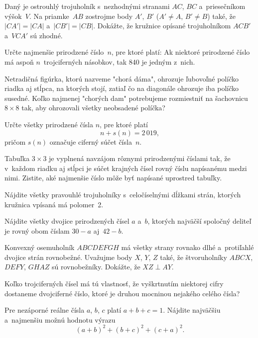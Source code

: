 {%
Daný je ostrouhlý trojuholník s~nezhodnými stranami $AC$, $BC$
a~priesečníkom výšok~$V$. Na priamke~$AB$ zostrojme body $A'$, $B'$
($A'\ne A$, $B'\ne B$) také, že $|CA'|=|CA|$ a~$|CB'|=|CB|$. Dokážte,
že kružnice opísané trojuholníkom $ACB'$ a~$VCA'$ sú zhodné.}

{%
Určte najmenšie prirodzené číslo~$n$, pre ktoré platí: Ak niektoré
prirodzené číslo má aspoň $n$~trojciferných násobkov, tak 840 je jedným
z~nich.}

{%
Netradičná figúrka, ktorú nazveme "chorá dáma", ohrozuje
ľubovoľné políčko riadka aj stĺpca, na ktorých stojí, zatiaľ čo na diagonále
ohrozuje iba políčko susedné.
Koľko najmenej "chorých dam" potrebujeme rozmiestniť na šachovnicu $8\times8$
tak, aby ohrozovali všetky neobsadené políčka?
%
}

{%
Určte všetky prirodzené čísla $n$, pre ktoré platí
$$
n+s(n)=2\,019,
$$
pričom $s(n)$ označuje ciferný súčet čísla~$n$.
}

{%
Tabuľka $3\times 3$ je vyplnená navzájom rôznymi prirodzenými číslami
tak, že v~každom riadku aj stĺpci je súčet krajných čísel rovný číslu
napísanému medzi nimi. Zistite, aké najmenšie číslo môže byť napísané
uprostred tabuľky.}

{%
Nájdite všetky pravouhlé trojuholníky s~celočíselnými dĺžkami strán,
ktorých kružnica vpísaná má polomer~2.}

{%
Nájdite všetky dvojice prirodzených čísel $a$ a~$b$, ktorých najväčší
spoločný deliteľ je rovný obom číslam $30-a$ aj~$42-b$.}

{%
Konvexný osemuholník $ABCDEFGH$ má všetky strany rovnako dlhé
a~protiľahlé dvojice strán rovnobežné. Uvažujme body $X$, $Y$, $Z$ také, že
štvoruholníky $ABCX$, $DEFY$, $GHAZ$ sú rovnobežníky.
Dokážte, že $XZ\perp AY$.}

{%
Koľko trojciferných čísel má tú vlastnosť, že vyškrtnutím niektorej
cifry dostaneme dvojciferné číslo, ktoré je druhou mocninou nejakého
celého čísla?}

{%
Pre nezáporné reálne čísla $a$, $b$, $c$ platí $a+b+c=1$. Nájdite
najväčšiu a~najmenšiu možnú hodnotu výrazu
$$
(a+b)^2+(b+c)^2+(c+a)^2.
$$
}

